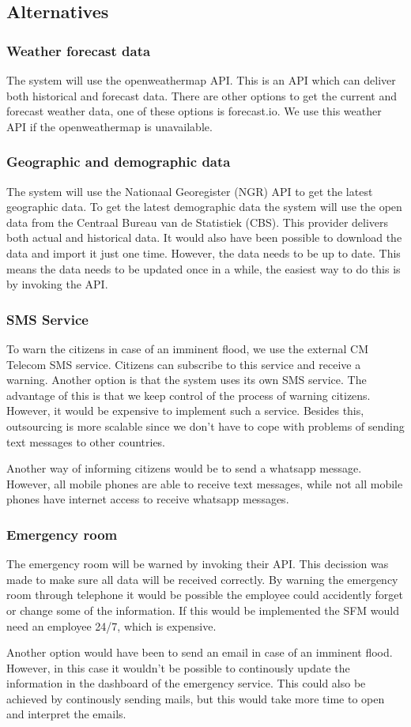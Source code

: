 \subsection{Alternatives}
\subsubsection*{Weather forecast data}
The system will use the openweathermap API. This is an API which can deliver both historical and forecast data. There are other options to get the current and forecast weather data, one of these options is forecast.io. We use this weather API if the openweathermap is unavailable. 

\subsubsection*{Geographic and demographic data}
The system will use the Nationaal Georegister (NGR) API to get the latest geographic data. To get the latest demographic data the system will use the open data from the Centraal Bureau van de Statistiek (CBS). This provider delivers both actual and historical data. It would also have been possible to download the data and import it just one time. However, the data needs to be up to date. This means the data needs to be updated once in a while, the easiest way to do this is by invoking the API.

\subsubsection*{SMS Service}
To warn the citizens in case of an imminent flood, we use the external CM Telecom SMS service. Citizens can subscribe to this service and receive a warning. Another option is that the system uses its own SMS service. The advantage of this is that we keep control of the process of warning citizens. However, it would be expensive to implement such a service. Besides this, outsourcing is more scalable since we don't have to cope with problems of sending text messages to other countries.

Another way of informing citizens would be to send a whatsapp message. However, all mobile phones are able to receive text messages, while not all mobile phones have internet access to receive whatsapp messages.  

\subsubsection*{Emergency room}
The emergency room will be warned by invoking their API. This decission was made to make sure all data will be received correctly. By warning the emergency room through telephone it would be possible the employee could accidently forget or change some of the information. If this would be implemented the SFM would need an employee 24/7, which is expensive. 

Another option would have been to send an email in case of an imminent flood. However, in this case it wouldn't be possible to continously update the information in the dashboard of the emergency service. This could also be achieved by continously sending mails, but this would take more time to open and interpret the emails.

